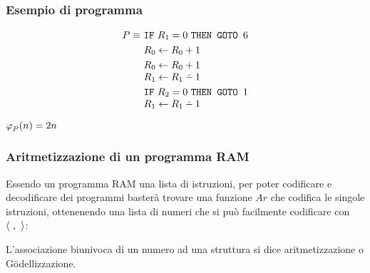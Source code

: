 \subsubsection*{Esempio di programma}
\vspace{-1em}
\begin{minipage}{.48\textwidth}
    \begin{align}
        P \equiv\ & \goto{R_1}{6}       \notag\\
        & R_0 \leftarrow R_0+1          \notag\\
        & R_0 \leftarrow R_0+1          \notag\\[-.3em]
        & R_1 \leftarrow R_1\dotminus 1 \notag\\
        & \goto{R_2}{1}                 \notag\\[-.3em]
        & R_1 \leftarrow R_1\dotminus 1 \notag
    \end{align}
\end{minipage}
\begin{minipage}{.48\textwidth}
    $ \semRAM_P(n) = 2n $
\end{minipage}

\subsubsection*{Aritmetizzazione di un programma RAM}
Essendo un programma RAM una lista di istruzioni, per poter codificare e decodificare
dei programmi basterà trovare una funzione $Ar$ che codifica le singole istruzioni, 
ottenenendo una lista di numeri che si può facilmente codificare con $\cantor{\ ,\ }$:
\begin{figure}[H]
    \centering
    
\end{figure}

L'associazione biunivoca di un numero ad una struttura si dice aritmetizzazione o
Gödellizzazione.

